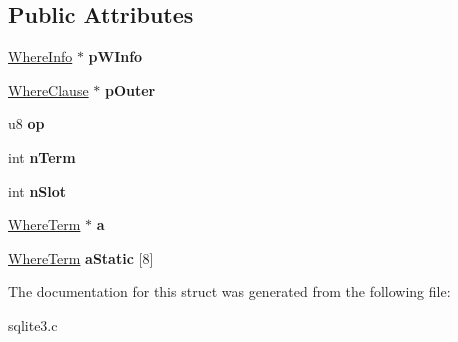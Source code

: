 \subsection*{Public Attributes}
\begin{DoxyCompactItemize}
\item 
\hyperlink{structWhereInfo}{Where\+Info} $\ast$ {\bfseries p\+W\+Info}\hypertarget{structWhereClause_a40045b5806b481237c7fc4c0e21cd29b}{}\label{structWhereClause_a40045b5806b481237c7fc4c0e21cd29b}

\item 
\hyperlink{structWhereClause}{Where\+Clause} $\ast$ {\bfseries p\+Outer}\hypertarget{structWhereClause_a6f72d61f416a323f39a8d3e2be62f607}{}\label{structWhereClause_a6f72d61f416a323f39a8d3e2be62f607}

\item 
u8 {\bfseries op}\hypertarget{structWhereClause_a7a56a5fe1ab6603e930f3b5372ff2f71}{}\label{structWhereClause_a7a56a5fe1ab6603e930f3b5372ff2f71}

\item 
int {\bfseries n\+Term}\hypertarget{structWhereClause_ab84924c3c78af1ab387ab3919c5031c4}{}\label{structWhereClause_ab84924c3c78af1ab387ab3919c5031c4}

\item 
int {\bfseries n\+Slot}\hypertarget{structWhereClause_ac92b93d65d4c3d9216707a049a4edb1c}{}\label{structWhereClause_ac92b93d65d4c3d9216707a049a4edb1c}

\item 
\hyperlink{structWhereTerm}{Where\+Term} $\ast$ {\bfseries a}\hypertarget{structWhereClause_a140d726a3e20ac7b6853d539c59add72}{}\label{structWhereClause_a140d726a3e20ac7b6853d539c59add72}

\item 
\hyperlink{structWhereTerm}{Where\+Term} {\bfseries a\+Static} \mbox{[}8\mbox{]}\hypertarget{structWhereClause_a4acb8640bc9f42752900de5735bcd8e0}{}\label{structWhereClause_a4acb8640bc9f42752900de5735bcd8e0}

\end{DoxyCompactItemize}


The documentation for this struct was generated from the following file\+:\begin{DoxyCompactItemize}
\item 
sqlite3.\+c\end{DoxyCompactItemize}
